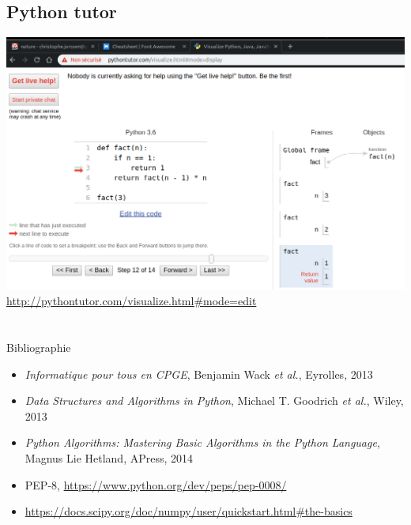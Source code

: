 \documentclass[10pt,aspectratio=169]{beamer}
\makeatletter
\def\beamer@writeslidentry@miniframesoff{%
  \expandafter\beamer@ifempty\expandafter{\beamer@framestartpage}{}%
  {%
    \clearpage\beamer@notesactions%
  }
}
\newcommand*{\miniframesoff}{\let\beamer@writeslidentry=\beamer@writeslidentry@miniframesoff}
\makeatother
\begin{document}
\subsection{Python tutor}

\begin{frame}
  \begin{center}
    \includegraphics[height = .7\textheight]{python-tutor-fact}
    \url{http://pythontutor.com/visualize.html\#mode=edit}
  \end{center}  
\end{frame}

\miniframesoff

\section{}

\begin{frame}{Bibliographie}
  \begin{itemize}
  \item \emph{Informatique pour tous en CPGE}, Benjamin Wack \emph{et al.}, Eyrolles, 2013
  \item \emph{Data Structures and Algorithms in Python}, Michael T. Goodrich \emph{et al.}, Wiley, 2013
  \item \emph{Python Algorithms: Mastering Basic Algorithms in the Python Language}, Magnus Lie Hetland, APress, 2014
  \item PEP-8, \url{https://www.python.org/dev/peps/pep-0008/}
  \item \url{https://docs.scipy.org/doc/numpy/user/quickstart.html\#the-basics}
  \end{itemize}
\end{frame}
\end{document}
